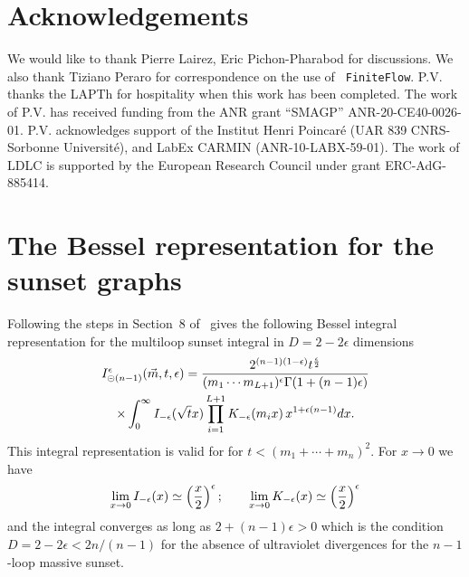 \documentclass[a4paper,12pt]{article}
\numberwithin{equation}{section}
\numberwithin{figure}{section}
\def\su{\circleddash}
\newcommand{\pvnote}[1]{\sethlcolor{bubblegum} \protect\hl{Pierre V.: #1} \sethlcolor{yellow}}
\begin{document}
\section*{Acknowledgements}
We would like to thank Pierre Lairez,  Eric Pichon-Pharabod  for discussions. We also thank Tiziano Peraro for correspondence on the use of {\tt
	FiniteFlow}. P.V. thanks the LAPTh for hospitality when this
      work has been completed.
The work of P.V. has received funding from the ANR grant ``SMAGP''
ANR-20-CE40-0026-01. P.V. acknowledges support of the Institut Henri
Poincar\'e (UAR 839 CNRS-Sorbonne Universit\'e), and LabEx CARMIN
(ANR-10-LABX-59-01). The work of LDLC is  supported by 
the European Research Council under grant ERC-AdG-885414. 


\appendix\section{The Bessel representation for the sunset graphs}\label{sec:bessel}


Following the steps in Section~8 of~\cite{Vanhove:2014wqa}
gives the following Bessel integral representation for the multiloop
sunset integral in  $D=2-2\epsilon$ dimensions
\begin{multline}
  I_{\su(n-1)}^\epsilon(\vec m,t,\epsilon)=
  {2^{(n-1) (1-\epsilon)} t^{\epsilon\over2} \over    (m_1\cdots m_{L+1})^{\epsilon}
  \Gamma(1+(n-1)\epsilon)}\cr\times\int_0^\infty I_{-\epsilon}(\sqrt{t} x)
  \prod_{i=1}^{L+1}K_{-\epsilon}(m_ix)\,  x^{1+\epsilon(n-1)}dx.
\end{multline}
This integral representation is valid for   for $t<(m_1+\cdots +m_{n})^2$.
%
For $x\to0$ we have
\begin{equation}
  \lim_{x\to0} I_{-\epsilon}(x)\simeq \left(x\over2\right)^{\epsilon};    \qquad
  \lim_{x\to0} K_{-\epsilon}(x)   \simeq \left(x\over2\right)^{\epsilon}
\end{equation}
and the integral converges as long as $2+(n-1)\epsilon>0$ which is the
condition $D=2-2\epsilon< 2n/(n-1)$ for the absence of ultraviolet divergences
for the $n-1$-loop massive sunset.
\end{document}
